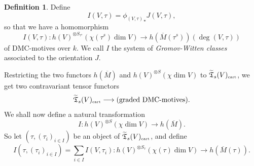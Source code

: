 \documentclass[11pt]{amsart}
\theoremstyle{definition}
\newtheorem{defn}[prop]{Definition}
\theoremstyle{remark}
\renewcommand{\tilde}{\widetilde}
\newcommand{\cart}{{\mbox{\tiny cart}}}
\newcommand{\lst}{_{\ast}}
\newcommand{\TT}{{\mathfrak{T}}}
\newcommand{\ol}{\overline}
\theoremstyle{plain}
\theoremstyle{definition}
\theoremstyle{remark}
\begin{document}
\begin{defn}
Define
\[
I(V,\tau)={\phi_{(V,\tau)}}\lst J(V,\tau),
\]
so that we have a homomorphism
\[
I(V,\tau):h(V)^{\otimes S_{\tau^s}}{(\chi(\tau^s)\dim V)}\longrightarrow
h(\ol{M}(\tau^s)){(\deg(V,\tau))}
\]
of DMC-motives over \(k\). We call \(I\) the system of {\em Gromov-Witten classes
}associated to the orientation \(J\).
\end{defn}

Restricting the two functors \(h(\ol{M})\) and \(h(V)^{\otimes S}{(\chi\dim V)}\)
to \(\tilde{\TT}_s(V)_\cart\), we
get two contravariant tensor functors
\[
\tilde{\TT}_s(V)_\cart\longrightarrow(\text{graded DMC-motives}).
\]
We shall now define a natural transformation
\[
I:h(V)^{\otimes S}{(\chi\dim V)}\longrightarrow h(\ol{M}).
\]
So let \((\tau,(\tau_i)_{i\in I})\) be an object of \(\tilde{\TT}_s(V)_\cart\), and
define
\[
I(\tau,(\tau_i)_{i\in I})=\sum_{i\in I}I(V,\tau_i):h(V)^{\otimes
S_{\tau}}{(\chi(\tau)\dim V)}\longrightarrow
h(\ol{M}(\tau)).
\]
\end{document}
